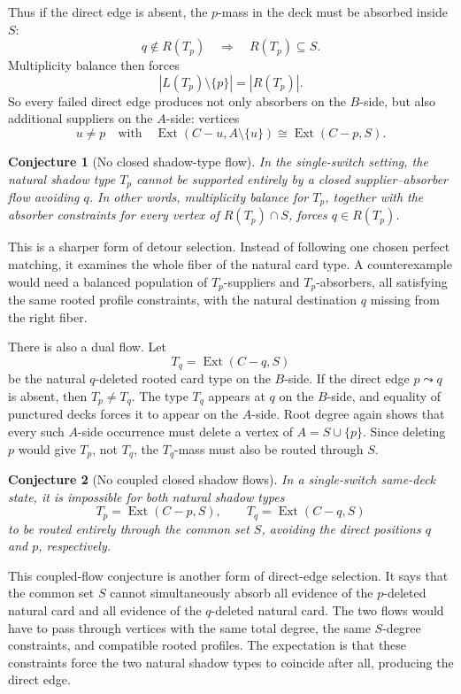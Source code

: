 \documentclass[11pt]{article}
\newtheorem{conjecture}{Conjecture}
\newcommand{\Ext}{\operatorname{Ext}}
\begin{document}
Thus if the direct edge is absent, the \(p\)-mass in the deck must be absorbed
inside \(S\):
\[
  q\notin R(T_p)
  \quad\Longrightarrow\quad
  R(T_p)\subseteq S.
\]
Multiplicity balance then forces
\[
  |L(T_p)\setminus\{p\}|=|R(T_p)|.
\]
So every failed direct edge produces not only absorbers on the \(B\)-side, but
also additional suppliers on the \(A\)-side: vertices
\[
  u\neq p
  \quad\text{with}\quad
  \Ext(C-u,A\setminus\{u\})\cong\Ext(C-p,S).
\]

\begin{conjecture}[No closed shadow-type flow]
In the single-switch setting, the natural shadow type \(T_p\) cannot be
supported entirely by a closed supplier--absorber flow avoiding \(q\).  In
other words, multiplicity balance for \(T_p\), together with the absorber
constraints for every vertex of \(R(T_p)\cap S\), forces \(q\in R(T_p)\).
\end{conjecture}

This is a sharper form of detour selection.  Instead of following one chosen
perfect matching, it examines the whole fiber of the natural card type.  A
counterexample would need a balanced population of \(T_p\)-suppliers and
\(T_p\)-absorbers, all satisfying the same rooted profile constraints, with
the natural destination \(q\) missing from the right fiber.

There is also a dual flow.  Let
\[
  T_q=\Ext(C-q,S)
\]
be the natural \(q\)-deleted rooted card type on the \(B\)-side.  If the
direct edge \(p\leadsto q\) is absent, then \(T_p\neq T_q\).  The type \(T_q\)
appears at \(q\) on the \(B\)-side, and equality of punctured decks forces it
to appear on the \(A\)-side.  Root degree again shows that every such
\(A\)-side occurrence must delete a vertex of \(A=S\cup\{p\}\).  Since
deleting \(p\) would give \(T_p\), not \(T_q\), the \(T_q\)-mass must also be
routed through \(S\).

\begin{conjecture}[No coupled closed shadow flows]
In a single-switch same-deck state, it is impossible for both natural shadow
types
\[
  T_p=\Ext(C-p,S),
  \qquad
  T_q=\Ext(C-q,S)
\]
to be routed entirely through the common set \(S\), avoiding the direct
positions \(q\) and \(p\), respectively.
\end{conjecture}

This coupled-flow conjecture is another form of direct-edge selection.  It
says that the common set \(S\) cannot simultaneously absorb all evidence of
the \(p\)-deleted natural card and all evidence of the \(q\)-deleted natural
card.  The two flows would have to pass through vertices with the same total
degree, the same \(S\)-degree constraints, and compatible rooted profiles.
The expectation is that these constraints force the two natural shadow types
to coincide after all, producing the direct edge.
\end{document}
